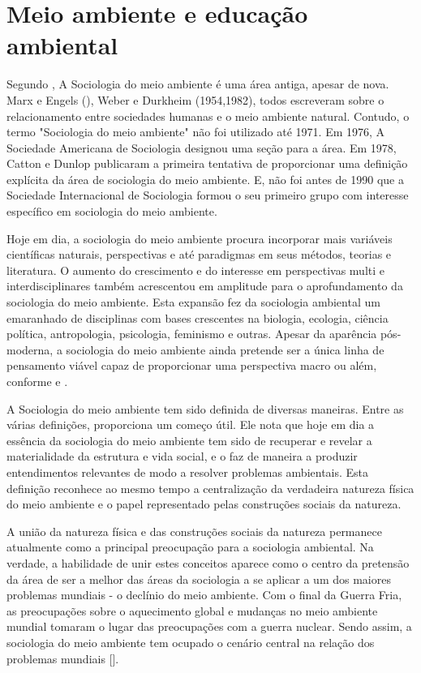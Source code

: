 \section{Meio ambiente e educação ambiental}

Segundo , A Sociologia do meio ambiente é uma área antiga, apesar de nova. Marx e Engels (), Weber e Durkheim (1954,1982), todos escreveram sobre o relacionamento entre sociedades humanas e o meio ambiente natural. Contudo, o termo "Sociologia do meio ambiente" não foi utilizado até 1971. Em 1976, A Sociedade Americana de Sociologia designou uma seção para a área. Em 1978, Catton e Dunlop publicaram a primeira tentativa de proporcionar uma definição explícita da área de sociologia do meio ambiente. E, não foi antes de 1990 que a Sociedade Internacional de Sociologia formou o seu primeiro grupo com interesse específico em sociologia do meio ambiente.

Hoje em dia, a sociologia do meio ambiente procura incorporar mais variáveis científicas naturais, perspectivas e até paradigmas em seus métodos, teorias e literatura. O aumento do crescimento e do interesse em perspectivas multi e interdisciplinares também acrescentou em amplitude para o aprofundamento da sociologia do meio ambiente. Esta expansão fez da sociologia ambiental um emaranhado de disciplinas com bases crescentes na biologia, ecologia, ciência política, antropologia, psicologia, feminismo e outras. Apesar da aparência pós-moderna, a sociologia do meio ambiente ainda pretende ser a única linha de pensamento viável capaz de proporcionar uma perspectiva macro ou além, conforme  e .

A Sociologia do meio ambiente tem sido definida de diversas maneiras. Entre as várias definições,   proporciona um começo útil. Ele nota que hoje em dia a essência da sociologia do meio ambiente tem sido de recuperar e revelar a materialidade da estrutura e vida social, e o faz de maneira a produzir entendimentos relevantes de modo a resolver problemas ambientais. Esta definição reconhece ao mesmo tempo a centralização da verdadeira natureza física do meio ambiente e o papel representado pelas construções sociais da natureza.

A união da natureza física e das construções sociais da natureza permanece atualmente como a principal preocupação para a sociologia ambiental. Na verdade, a habilidade de unir estes conceitos aparece como o centro da pretensão da área de ser a melhor das áreas da sociologia a se aplicar a um dos maiores problemas mundiais - o declínio do meio ambiente. Com o final da Guerra Fria, as preocupações sobre o aquecimento global e mudanças no meio ambiente mundial tomaram o lugar das preocupações com a guerra nuclear. Sendo assim, a sociologia do meio ambiente tem ocupado o cenário central na relação dos problemas mundiais [].

